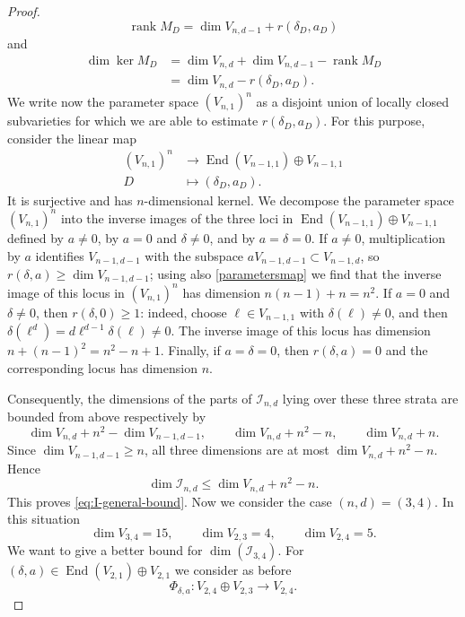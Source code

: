 \documentclass[10pt,a4paper]{amsart}
\DeclareMathOperator{\rank}{rank}
\numberwithin{equation}{section}
\theoremstyle{plain}
\theoremstyle{definition}
\theoremstyle{plain}
\theoremstyle{definition}
\begin{document}
\begin{proof}
\[
\rank M_D=\dim V_{n,d-1}+r(\delta_D,a_D)
\tag{3}\label{eq:rank-MD-two-parts}
\]
and
\[
\begin{aligned}
\dim\ker M_D
&=\dim V_{n,d}+\dim V_{n,d-1}-\rank M_D\\
&=\dim V_{n,d}-r(\delta_D,a_D).
\end{aligned}
\tag{4}\label{eq:kernel-MD-two-parts}
\]
We write now the parameter space $(V_{n,1})^n$ as a disjoint union of locally closed subvarieties for which we are able to   estimate \(r(\delta_D,a_D)\). For this purpose, consider the linear map
\begin{equation}
\label{parametersmap}
\begin{aligned}
(V_{n,1})^n
&\longrightarrow \operatorname{End}(V_{n-1,1})\oplus V_{n-1,1}\\
D&\longmapsto(\delta_D,a_D).
\end{aligned}
\end{equation}
It is surjective and has \(n\)-dimensional kernel. We decompose the parameter space $(V_{n,1})^n$ into the inverse images of the three loci in $\operatorname{End}(V_{n-1,1})\oplus V_{n-1,1}$ defined by $a\ne0$, by $a=0$ and $\delta\ne0$, and by $a=\delta=0$. If $a\ne0$, multiplication by $a$ identifies $V_{n-1,d-1}$ with the subspace $aV_{n-1,d-1}\subset V_{n-1,d}$, so $r(\delta,a)\ge \dim V_{n-1,d-1}$; using also \eqref{parametersmap} we find that  the inverse image of this locus in $(V_{n,1})^n$ has dimension $n(n-1)+n=n^2$. If $a=0$ and $\delta\ne0$, then $r(\delta,0)\ge1$: indeed, choose $\ell\in V_{n-1,1}$ with $\delta(\ell)\ne0$, and then $\delta(\ell^d)=d\ell^{d-1}\delta(\ell)\ne0$. The inverse image of this  locus has dimension $n+(n-1)^2=n^2-n+1$. Finally, if $a=\delta=0$, then $r(\delta,a)=0$ and the corresponding locus has dimension $n$. 

Consequently, the dimensions of the parts of $\mathcal I_{n,d}$ lying  over these three strata are bounded from above respectively by
\[
   \dim V_{n,d}+n^2-\dim V_{n-1,d-1},\qquad
   \dim V_{n,d}+n^2-n,\qquad
   \dim V_{n,d}+n.
\]
Since $\dim V_{n-1,d-1}\ge n$, all three dimensions are at most $\dim V_{n,d}+n^2-n$. Hence
\[
\dim\mathcal I_{n,d}\le\dim V_{n,d}+n^2-n.
\]
This proves \eqref{eq:I-general-bound}. Now we consider the case $(n,d)=(3,4)$. In this situation
\[
\dim V_{3,4}=15,
\qquad
\dim V_{2,3}=4,
\qquad
\dim V_{2,4}=5.
\]
We want to give a better bound for $\operatorname{dim}(\mathcal{I}_{3,4})$. For $(\delta,a) \in \operatorname{End}(V_{2,1}) \oplus V_{2,1}$ we consider as before
\[
\Phi_{\delta,a}\colon V_{2,4} \oplus V_{2,3} \rightarrow V_{2,4}.
\]



\end{proof}
\end{document}
